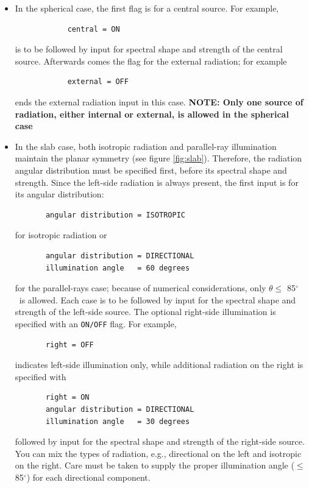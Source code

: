 \documentclass[11pt]{article}
\def\deg    {\hbox{$^\circ$}}
\begin{document}
\begin{itemize}

\item In the spherical case, the first flag is for a central
  source. For example,
\begin{verbatim}
            central = ON
\end{verbatim}
  is to be followed by input for spectral shape and strength of the
  central source. Afterwards comes the flag for the external
  radiation; for example
\begin{verbatim}
            external = OFF
\end{verbatim}
  ends the external radiation input in this case. \textbf{NOTE: Only
    one source of radiation, either internal or external, is allowed
    in the spherical case}

\item In the slab case, both isotropic radiation and parallel-ray
  illumination maintain the planar symmetry (see figure
  \ref{fig:slab}).  Therefore, the radiation angular distribution must
  be specified first, before its spectral shape and strength. Since
  the left-side radiation is always present, the first input is for
  its angular distribution:
\begin{verbatim}
       angular distribution = ISOTROPIC
\end{verbatim}
  for isotropic radiation or
\begin{verbatim}
       angular distribution = DIRECTIONAL
       illumination angle   = 60 degrees
\end{verbatim}
  for the parallel-rays case; because of numerical considerations,
  only $\theta \le$ 85\deg\ is allowed. Each case is to be followed by
  input for the spectral shape and strength of the left-side
  source. The optional right-side illumination is specified with an
  {\tt ON/OFF} flag. For example,
\begin{verbatim}
       right = OFF
\end{verbatim}
  indicates left-side illumination only, while additional radiation on
  the right is specified with
\begin{verbatim}
       right = ON
       angular distribution = DIRECTIONAL
       illumination angle   = 30 degrees
\end{verbatim}
  followed by input for the spectral shape and strength of the
  right-side source. You can mix the types of radiation, e.g.,
  directional on the left and isotropic on the right. Care must be
  taken to supply the proper illumination angle ($\le$ 85\deg) for
  each directional component.
\end{itemize}
\end{document}
